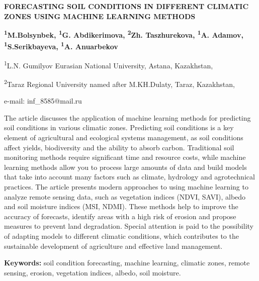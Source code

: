 \begin{articleheader}
{\bfseries FORECASTING SOIL CONDITIONS IN DIFFERENT CLIMATIC ZONES USING
MACHINE LEARNING METHODS}

{\bfseries
\textsuperscript{1}M.Bolsynbek,
\textsuperscript{1}G. Abdikerimova,
\textsuperscript{2}Zh. Taszhurekova,
\textsuperscript{1}A. Adamov,
\textsuperscript{1}S.Serikbayeva\textsuperscript{\envelope },
\textsuperscript{1}A. Anuarbekov
}
\end{articleheader}

\begin{affiliation}
\textsuperscript{1}L.N. Gumilyov Eurasian National University, Astana, Kazakhstan,

\textsuperscript{2}Taraz Regional University named after M.KH.Dulaty, Taraz, Kazakhstan,

e-mail: inf\_8585@mail.ru
\end{affiliation}

The article discusses the application of machine learning methods for
predicting soil conditions in various climatic zones. Predicting soil
conditions is a key element of agricultural and ecological systems
management, as soil conditions affect yields, biodiversity and the
ability to absorb carbon. Traditional soil monitoring methods require
significant time and resource costs, while machine learning methods
allow you to process large amounts of data and build models that take
into account many factors such as climate, hydrology and agrotechnical
practices. The article presents modern approaches to using machine
learning to analyze remote sensing data, such as vegetation indices
(NDVI, SAVI), albedo and soil moisture indices (MSI, NDMI). These
methods help to improve the accuracy of forecasts, identify areas with a
high risk of erosion and propose measures to prevent land degradation.
Special attention is paid to the possibility of adapting models to
different climatic conditions, which contributes to the sustainable
development of agriculture and effective land management.

{\bfseries Keywords:} soil condition forecasting, machine learning,
climatic zones, remote sensing, erosion, vegetat\-ion indices, albedo,
soil moisture.

